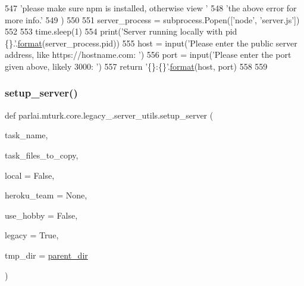 \begin{DoxyCode}
547             \textcolor{stringliteral}{'please make sure npm is installed, otherwise view '}
548             \textcolor{stringliteral}{'the above error for more info.'}
549         )
550 
551     server\_process = subprocess.Popen([\textcolor{stringliteral}{'node'}, \textcolor{stringliteral}{'server.js'}])
552 
553     time.sleep(1)
554     print(\textcolor{stringliteral}{'Server running locally with pid \{\}.'}.\hyperlink{namespaceparlai_1_1chat__service_1_1services_1_1messenger_1_1shared__utils_a32e2e2022b824fbaf80c747160b52a76}{format}(server\_process.pid))
555     host = input(\textcolor{stringliteral}{'Please enter the public server address, like https://hostname.com: '})
556     port = input(\textcolor{stringliteral}{'Please enter the port given above, likely 3000: '})
557     \textcolor{keywordflow}{return} \textcolor{stringliteral}{'\{\}:\{\}'}.\hyperlink{namespaceparlai_1_1chat__service_1_1services_1_1messenger_1_1shared__utils_a32e2e2022b824fbaf80c747160b52a76}{format}(host, port)
558 
559 
\end{DoxyCode}
\mbox{\label{namespaceparlai_1_1mturk_1_1core_1_1legacy__2018_1_1server__utils_af65b71753d79d3513be6d4c890853a4d}} 
\subsubsection{\texorpdfstring{setup\+\_\+server()}{setup\_server()}}
{\footnotesize\ttfamily def parlai.\+mturk.\+core.\+legacy\+\_.\+server\+\_\+utils.\+setup\+\_\+server (\begin{DoxyParamCaption}\item[{}]{task\+\_\+name,  }\item[{}]{task\+\_\+files\+\_\+to\+\_\+copy,  }\item[{}]{local = {\ttfamily False},  }\item[{}]{heroku\+\_\+team = {\ttfamily None},  }\item[{}]{use\+\_\+hobby = {\ttfamily False},  }\item[{}]{legacy = {\ttfamily True},  }\item[{}]{tmp\+\_\+dir = {\ttfamily \hyperlink{namespaceparlai_1_1mturk_1_1core_1_1legacy__2018_1_1server__utils_a6a871d2f8e5c0768a82ab8fa2e7fadae}{parent\+\_\+dir}} }\end{DoxyParamCaption})}



